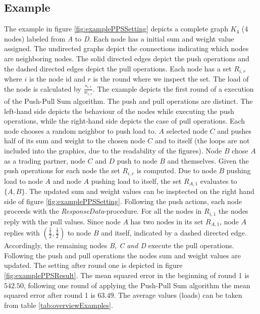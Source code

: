 \subsection{Example}\label{subsec:examplePPS}
%     
The example in figure \ref{fig:examplePPSSetting} depicts a complete graph $K_4$ (4 nodes) labeled from \textit{A} to \textit{D}. Each node has a initial sum and weight value assigned. The undirected graphs depict the connections indicating which nodes are neighboring nodes. The solid directed edges depict the push operations and the dashed directed edges depict the pull operations. Each node has a set $R_{i,r}$ where $i$ is the node id and $r$ is the round where we inspect the set. The load of the node is calculated by $\frac{s_{i,r}}{w_{i,r}}$. The example depicts the first round of a execution of the Push-Pull Sum algorithm. The push and pull operations are distinct. The left-hand side depicts the behaviour of the nodes while executing the push operations, while the right-hand side depicts the case of pull operations. Each node chooses a random neighbor to push load to. $A$ selected node $C$ and pushes half of its sum and weight to the chosen node $C$ and to itself (the loops are not included into the graphics, due to the readability of the figures). Node $B$ chose $A$ as a trading partner, node $C$ and $D$ push to node $B$ and themselves. Given the push operations for each node the set $R_{i,r}$ is computed. Due to node $B$ pushing load to node $A$ and node $A$ pushing load to itself, the set $R_{A,1}$ evaluates to $\{A,B\}$. The updated sum and weight values can be insptected on the right hand side of figure \ref{fig:examplePPSSetting}. Following the push actions, each node proceeds with the \textit{ResponseData}-procedure. For all the nodes in $R_{i,1}$ the nodes reply with the pull values. Since node $A$ has two nodes in its set $R_{A,1}$, node $A$ replies with $\left(\frac{\frac{3}{2}}{2}, \frac{\frac{1}{2}}{2}\right)$ to node $B$ and itself, indicated by a dashed directed edge. Accordingly, the remaining nodes \textit{B, C and D} execute the pull operations. Following the push and pull operations the nodes sum and weight values are updated. The setting after round one is depicted in figure \ref{fig:examplePPSResult}. The mean squared error in the beginning of round 1 is $542.50$, following one round of applying the Push-Pull Sum algorithm the mean squared error after round 1 is $63.49$. The average values (loads) can be taken from table \ref{tab:overviewExamples}.

